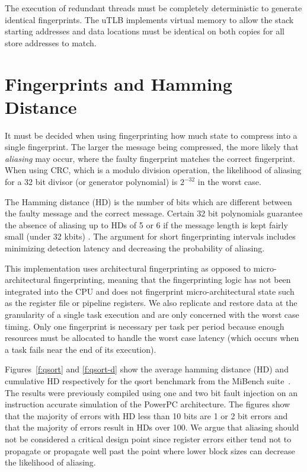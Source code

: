 	The execution of redundant threads must be completely deterministic to generate identical fingerprints. 
	The uTLB implements virtual memory to allow the stack starting addresses and data locations must be identical on both copies for all store addresses to match.

\section{Fingerprints and Hamming Distance}

	It must be decided when using fingerprinting how much state to compress into a single fingerprint. The larger the message being compressed, the more likely that \emph{aliasing} may occur, where the faulty fingerprint matches the correct fingerprint. 
	When using CRC, which is a modulo division operation, the likelihood of aliasing for a 32 bit divisor (or generator polynomial) is $2^{-32}$ in the worst case.
	
	The Hamming distance (HD) is the number of bits which are different between the faulty message and the correct message. 
	Certain 32 bit polynomials guarantee the absence of aliasing up to HDs of 5 or 6 if the message length is kept fairly small (under 32 kbits) \cite{koopman200232}.
	The argument for short fingerprinting intervals includes minimizing detection latency and decreasing the probability of aliasing.

	This implementation uses architectural fingerprinting as opposed to micro-architectural fingerprinting, meaning that the fingerprinting logic has not been integrated into the CPU and does not fingerprint micro-architectural state such as the register file or pipeline registers.
	We also replicate and restore data at the granularity of a single task execution and are only concerned with the worst case timing.
	Only one fingerprint is necessary per task per period because enough resources must be allocated to handle the worst case latency (which occurs when a task fails near the end of its execution). 
		
	Figures~\ref{f:qsort} and \ref{f:qsort-d} show the average hamming distance (HD) and cumulative HD respectively for the qsort benchmark from the MiBench suite~\cite{guthaus2001mibench}. 
	The results were previously compiled using one and two bit fault injection on an instruction accurate simulation of the PowerPC architecture. 
	The figures show that the majority of errors with HD less than 10 bits are 1 or 2 bit errors and that the majority of errors result in HDs over 100. 
	We argue that aliasing should not be considered a critical design point since register errors either tend not to propagate or propagate well past the point where lower block sizes can decrease the likelihood of aliasing.
	
